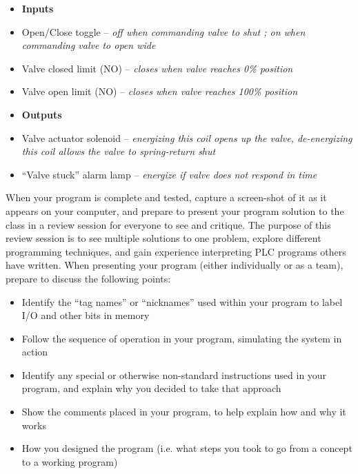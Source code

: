 \documentclass[12pt,a4paper]{article}
\begin{document}
\begin{itemize}
\item{} {\bf Inputs} 
\item{} Open/Close toggle -- {\it off when commanding valve to shut ; on when commanding valve to open wide}
\item{} Valve closed limit (NO) -- {\it closes when valve reaches 0\% position}
\item{} Valve open limit (NO) -- {\it closes when valve reaches 100\% position}
\end{itemize}

\begin{itemize}
\item{} {\bf Outputs} 
\item{} Valve actuator solenoid -- {\it energizing this coil opens up the valve, de-energizing this coil allows the valve to spring-return shut}
\item{} ``Valve stuck'' alarm lamp -- {\it energize if valve does not respond in time}
\end{itemize}

When your program is complete and tested, capture a screen-shot of it as it appears on your computer, and prepare to present your program solution to the class in a review session for everyone to see and critique.  The purpose of this review session is to see multiple solutions to one problem, explore different programming techniques, and gain experience interpreting PLC programs others have written.  When presenting your program (either individually or as a team), prepare to discuss the following points:

\begin{itemize}
\item{} Identify the ``tag names'' or ``nicknames'' used within your program to label I/O and other bits in memory
\item{} Follow the sequence of operation in your program, simulating the system in action
\item{} Identify any special or otherwise non-standard instructions used in your program, and explain why you decided to take that approach
\item{} Show the comments placed in your program, to help explain how and why it works
\item{} How you designed the program (i.e. what steps you took to go from a concept to a working program)
\end{itemize}

\vskip 10pt \filbreak 
\end{document}
